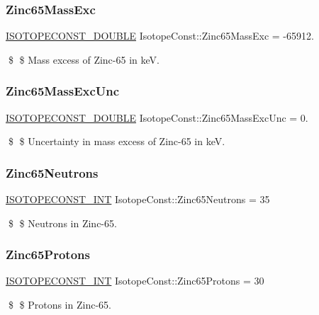 \subsubsection{\texorpdfstring{Zinc65\+Mass\+Exc}{Zinc65MassExc}}
{\footnotesize\ttfamily \mbox{\hyperlink{group___isotope_const-_macros_ga8f45a7272ce02c0b4c65c44636ed719a}{I\+S\+O\+T\+O\+P\+E\+C\+O\+N\+S\+T\+\_\+\+D\+O\+U\+B\+LE}} Isotope\+Const\+::\+Zinc65\+Mass\+Exc = -\/65912.}

\$ \$ Mass excess of Zinc-\/65 in keV. \mbox{\label{group___isotope_const-_zinc-_zn65_ga0c45dda606e86ad2989468a47df48241}} 
\subsubsection{\texorpdfstring{Zinc65\+Mass\+Exc\+Unc}{Zinc65MassExcUnc}}
{\footnotesize\ttfamily \mbox{\hyperlink{group___isotope_const-_macros_ga8f45a7272ce02c0b4c65c44636ed719a}{I\+S\+O\+T\+O\+P\+E\+C\+O\+N\+S\+T\+\_\+\+D\+O\+U\+B\+LE}} Isotope\+Const\+::\+Zinc65\+Mass\+Exc\+Unc = 0.}

\$ \$ Uncertainty in mass excess of Zinc-\/65 in keV. \mbox{\label{group___isotope_const-_zinc-_zn65_ga489ca9365f7b09505b0197199f606fbf}} 
\subsubsection{\texorpdfstring{Zinc65\+Neutrons}{Zinc65Neutrons}}
{\footnotesize\ttfamily \mbox{\hyperlink{group___isotope_const-_macros_ga5f18360b3e99483a35c32d789e62621c}{I\+S\+O\+T\+O\+P\+E\+C\+O\+N\+S\+T\+\_\+\+I\+NT}} Isotope\+Const\+::\+Zinc65\+Neutrons = 35}

\$ \$ Neutrons in Zinc-\/65. \mbox{\label{group___isotope_const-_zinc-_zn65_gab967711cd4829ed9af3a69e2a3bad8a5}} 
\subsubsection{\texorpdfstring{Zinc65\+Protons}{Zinc65Protons}}
{\footnotesize\ttfamily \mbox{\hyperlink{group___isotope_const-_macros_ga5f18360b3e99483a35c32d789e62621c}{I\+S\+O\+T\+O\+P\+E\+C\+O\+N\+S\+T\+\_\+\+I\+NT}} Isotope\+Const\+::\+Zinc65\+Protons = 30}

\$ \$ Protons in Zinc-\/65. 